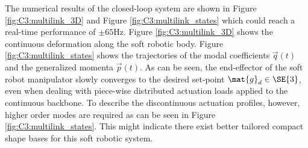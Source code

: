 The numerical results of the closed-loop system are shown in Figure \ref{fig:C3:multilink_3D} and Figure \ref{fig:C3:multilink_states} which could reach a real-time performance of $\pm65$Hz. Figure \ref{fig:C3:multilink_3D} shows the continuous deformation along the soft robotic body. Figure \ref{fig:C3:multilink_states} shows the trajectories of the modal coefficients $\vec{q}(t)$ and the generalized momenta $\vec{p}(t)$. As can be seen, the end-effector of the soft robot manipulator slowly converges to the desired set-point $\mat{g}_d \in \SE{3}$, even when dealing with piece-wise distributed actuation loads applied to the continuous backbone. To describe the discontinuous actuation profiles, however, higher order modes are required as can be seen in Figure \ref{fig:C3:multilink_states}. This might indicate there exist better tailored compact shape bases for this soft robotic system.
%
